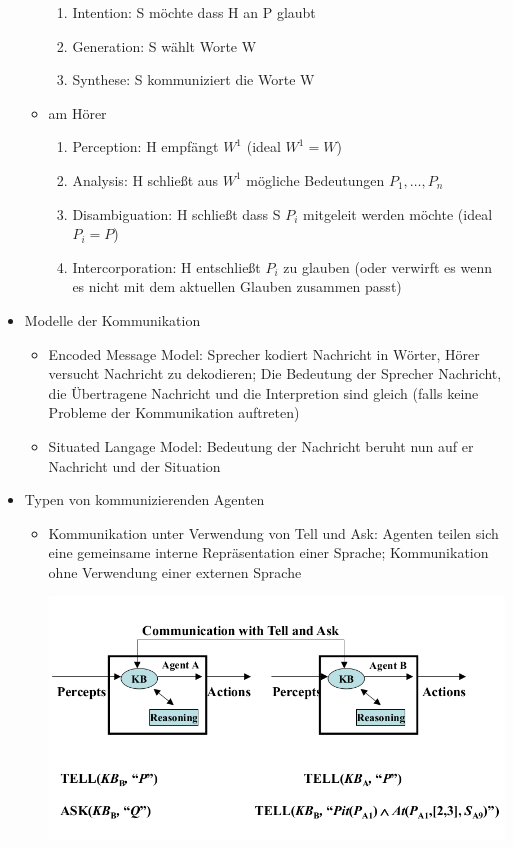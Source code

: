\documentclass{article} %
\begin{document}
\begin{itemize}
\begin{itemize}
			\begin{enumerate}
				\item Intention: S möchte dass H an P glaubt
				\item Generation: S wählt Worte W
				\item Synthese: S kommuniziert die Worte W
			\end{enumerate}
			\item am Hörer
			\begin{enumerate}
				\item Perception: H empfängt $W^1$ (ideal $W^1 = W$)
				\item Analysis: H schließt aus $W^1$ mögliche Bedeutungen $P_1,\dots,P_n$
				\item Disambiguation: H schließt dass S $P_i$ mitgeleit werden möchte (ideal $P_i = P$)
				\item Intercorporation: H entschließt $P_i$ zu glauben (oder verwirft es wenn es nicht mit dem aktuellen Glauben zusammen passt)
			\end{enumerate}
		\end{itemize}
		\item Modelle der Kommunikation
		\begin{itemize}
			\item Encoded Message Model: Sprecher kodiert Nachricht in Wörter, Hörer versucht Nachricht zu dekodieren; Die Bedeutung der Sprecher Nachricht, die Übertragene Nachricht und die Interpretion sind gleich (falls keine Probleme der Kommunikation auftreten)
			\item Situated Langage Model: Bedeutung der Nachricht beruht nun auf er Nachricht und der Situation
		\end{itemize}
		\item Typen von kommunizierenden Agenten
		\begin{itemize}
			\item Kommunikation unter Verwendung von Tell und Ask: Agenten teilen sich eine gemeinsame interne Repräsentation einer Sprache; Kommunikation ohne Verwendung einer externen Sprache
			\begin{center}
				\includegraphics[scale=0.3]{img/tell and ask.png}

\end{center}
\end{itemize}
\end{itemize}
\end{document}
